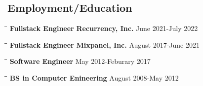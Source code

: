 \documentclass{res}
\begin{document}
 
\thispagestyle{empty} %
\address{\url{https://github.com/ksiondag}\\
ksiondag846@gmail.com\\
(520) 329-5081\\
Seattle, WA}


\begin{resume}
   
\section{Employment/Education} 
\vspace{-0.1in} 
  \begin{tabbing}
    \hspace{2.2in}\= \hspace{2.2in}\= \kill
    {\bf Fullstack Engineer} \> {\bf Recurrency, Inc.}     \>June 2021-July 2022
  \end{tabbing}\vspace{-5pt}

  \vspace{-20pt}\begin{tabbing}
    \hspace{2.2in}\= \hspace{2.2in}\= \kill
    {\bf Fullstack Engineer} \> {\bf Mixpanel, Inc.}     \>August 2017-June 2021
  \end{tabbing}\vspace{-5pt}

  \vspace{-20pt}\begin{tabbing}
    \hspace{2.2in}\= \hspace{2.2in}\= \kill
    {\bf Software Engineer}  \> May 2012-Feburary 2017
  \end{tabbing}\vspace{-5pt}

  \vspace{-20pt}\begin{tabbing}
    \hspace{2.2in}\= \hspace{2.2in}\= \kill
    {\bf BS in Computer Enineering}  \> August 2008-May 2012\\
  \end{tabbing}\vspace{-5pt}



\end{resume}
\end{document}
